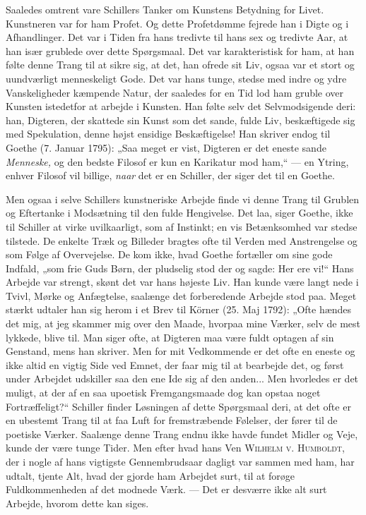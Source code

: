 \documentclass[12pt,a4paper,openany]{book}
\newcommand{\opage}[1]{\marginnote{\footnotesize\textit{[#1]}}}
\begin{document}
Saaledes omtrent vare Schillers Tanker om Kunstens Betydning
for Livet. Kunstneren var for ham Profet. Og dette
Profetdømme fejrede han i Digte og i Afhandlinger. Det var
i Tiden fra hans tredivte til hans sex og tredivte Aar, at han
især grublede over dette Spørgsmaal. Det var karakteristisk
for ham, at han følte denne Trang til at sikre sig, at det, han
ofrede sit Liv, ogsaa var et stort og uundværligt menneskeligt
Gode. Det var hans tunge, stedse med indre og ydre Vanskeligheder
kæmpende Natur, der saaledes for en Tid lod ham
gruble over Kunsten istedetfor at arbejde i Kunsten. Han følte
selv det Selvmodsigende deri: han, Digteren, der skattede sin
\setcounter{footnote}{0}%
\opage{180}Kunst som det sande, fulde Liv, beskæftigede sig med Spekulation,
denne højst ensidige Beskæftigelse! Han skriver endog
til Goethe (7. Januar 1795): „Saa meget er vist, Digteren er
det eneste sande \textit{Menneske,} og den bedste Filosof er kun en
Karikatur mod ham,“ --- en Ytring, enhver Filosof vil billige,
\textit{naar} det er en Schiller, der siger det til en Goethe.

Men ogsaa i selve Schillers kunstneriske Arbejde finde vi
denne Trang til Grublen og Eftertanke i Modsætning til den
fulde Hengivelse. Det laa, siger Goethe, ikke til Schiller at
virke uvilkaarligt, som af Instinkt; en vis Betænksomhed var
stedse tilstede. De enkelte Træk og Billeder bragtes ofte til
Verden med Anstrengelse og som Følge af Overvejelse. De
kom ikke, hvad Goethe fortæller om sine gode Indfald, „som
frie Guds Børn, der pludselig stod der og sagde: Her ere vi!“
Hans Arbejde var strengt, skønt det var hans højeste Liv. Han
kunde være langt nede i Tvivl, Mørke og Anfægtelse, saalænge
det forberedende Arbejde stod paa. Meget stærkt udtaler han
sig herom i et Brev til Körner (25. Maj 1792): „Ofte hændes
det mig, at jeg skammer mig over den Maade, hvorpaa mine
Værker, selv de mest lykkede, blive til. Man siger ofte, at
Digteren maa være fuldt optagen af sin Genstand, mens han
skriver. Men for mit Vedkommende er det ofte en eneste og
ikke altid en vigtig Side ved Emnet, der faar mig til at bearbejde
det, og først under Arbejdet udskiller saa den ene Ide
sig af den anden... Men hvorledes er det muligt, at der af
en saa upoetisk Fremgangsmaade dog kan opstaa noget Fortræffeligt?“
Schiller finder Løsningen af dette Spørgsmaal deri,
at det ofte er en ubestemt Trang til at faa Luft for fremstræbende
Følelser, der fører til de poetiske Værker. Saalænge
denne Trang endnu ikke havde fundet Midler og Veje, kunde
der være tunge Tider. Men efter hvad hans Ven \textsc{Wilhelm v.}
\textsc{Humboldt}, der i nogle af hans vigtigste Gennembrudsaar dagligt
var sammen med ham, har udtalt, tjente Alt, hvad der
gjorde ham Arbejdet surt, til at forøge Fuldkommenheden af
det modnede Værk. --- Det er desværre ikke alt surt Arbejde,
hvorom dette kan siges.
\end{document}

